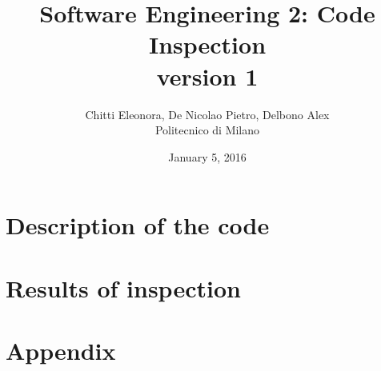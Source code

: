 \documentclass[12pt, a4paper]{report}
\begin{document}
\title{Software Engineering 2: Code Inspection \\ version 1}
\author{Chitti Eleonora, De Nicolao Pietro, Delbono Alex\\
Politecnico di Milano}
\date{January 5, 2016}
\maketitle
\tableofcontents

\chapter{Description of the code}



\chapter{Results of inspection}


\appendix
\chapter{Appendix}




\end{document}
